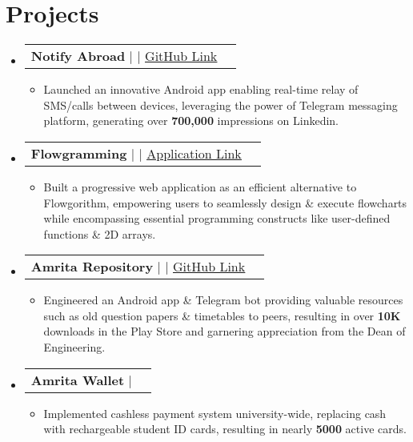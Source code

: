 \documentclass[letterpaper,11pt]{article}
\makeatletter
\newcommand{\resumeItem}[1]{
  \item\small{
    {#1 \vspace{-2pt}}
  }
}
\newcommand{\resumeProjectHeading}[2]{
    \item
    \begin{tabular*}{1.001\textwidth}{l@{\extracolsep{\fill}}r}
      \small#1 & \textbf{\small #2}\\
    \end{tabular*}\vspace{-7pt}
}
\newcommand{\resumeSubHeadingListStart}{\begin{itemize}[leftmargin=0.0in, label={}]}
\newcommand{\resumeSubHeadingListEnd}{\end{itemize}}
\newcommand{\resumeItemListStart}{\begin{itemize}}
\newcommand{\resumeItemListEnd}{\end{itemize}\vspace{-5pt}}
\makeatother
\begin{document}
\section{Projects}
    \vspace{-5pt}
    \resumeSubHeadingListStart
        \resumeProjectHeading
          {\textbf{Notify Abroad} $|$ \text{Android, Java} $|$ \href{https://github.com/rajkumaar23/notify-abroad}{\underline{GitHub Link}}}{}
          \resumeItemListStart
            \resumeItem{Launched an innovative Android app enabling real-time relay of SMS/calls between devices, leveraging the power of Telegram messaging platform, generating over \textbf{700,000} impressions on Linkedin.}
          \resumeItemListEnd 
         \vspace{-17pt}
    \resumeProjectHeading
          {\textbf{Flowgramming} $|$ \text{HTML, Bootstrap, jQuery,  JointJS} $|$ \href{https://flowgrammers-org.github.io/flowgramming/}{\underline{Application Link}}}{}
          \resumeItemListStart
            \resumeItem{Built a progressive web application as an efficient alternative to Flowgorithm, empowering users to seamlessly design \& execute flowcharts while encompassing essential programming constructs like user-defined functions \& 2D arrays.}
          \resumeItemListEnd 
          \vspace{-17pt}
      \resumeProjectHeading
          {\textbf{Amrita Repository} $|$ \text{Android, SQLite, Web Scraping, PHP, Python} $|$ \href{https://github.com/rajkumaar23/amrita-repository}{\underline {GitHub Link}}}{}
          \resumeItemListStart
            \resumeItem{Engineered an Android app  \& Telegram bot providing valuable resources such as old question papers \& timetables to peers, resulting in over \textbf{10K} downloads in the Play Store and garnering appreciation from the Dean of Engineering.}
          \resumeItemListEnd
          \vspace{-17pt}
      \resumeProjectHeading
          {\textbf{Amrita Wallet} $|$ \text{Android, NodeJS, MongoDB, VueJS}}{}
          \resumeItemListStart
            \resumeItem{Implemented cashless payment system university-wide, replacing cash with rechargeable student ID cards, resulting in nearly \textbf{5000} active cards.}
          \resumeItemListEnd 
    \resumeSubHeadingListEnd
\vspace{-10pt}


%
\end{document}
